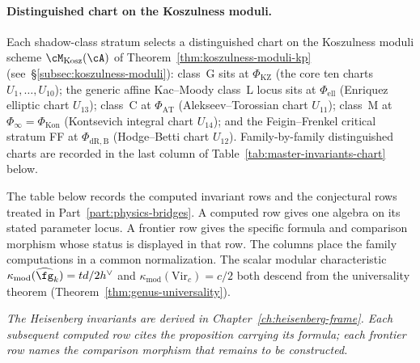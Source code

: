 \paragraph{Distinguished chart on the Koszulness moduli.}
Each shadow-class stratum selects a distinguished chart on the
Koszulness moduli scheme
$\cM_{\mathrm{Kosz}}(\cA)$ of
Theorem~\ref{thm:koszulness-moduli-kp}
(see~\S\ref{subsec:koszulness-moduli}):
class~G sits at $\Phi_{\mathrm{KZ}}$ (the core ten charts
$U_1,\ldots,U_{10}$); the generic affine Kac--Moody class~L locus sits
at $\Phi_{\mathrm{ell}}$ (Enriquez elliptic chart $U_{13}$); class~C at
$\Phi_{\mathrm{AT}}$ (Alekseev--Torossian chart $U_{11}$);
class~M at $\Phi_\infty = \Phi_{\mathrm{Kon}}$ (Kontsevich
integral chart $U_{14}$); and the Feigin--Frenkel critical
stratum FF at $\Phi_{\mathrm{dR,B}}$ (Hodge--Betti chart
$U_{12}$). Family-by-family distinguished charts are recorded in
the last column of Table~\ref{tab:master-invariants-chart}
below.

The table below records the computed invariant rows and the
conjectural rows treated in Part~\ref{part:physics-bridges}.  A
computed row gives one algebra on its stated parameter locus.  A
frontier row gives the specific formula and comparison morphism whose
status is displayed in that row.  The columns place the family
computations in a common normalization.
The scalar modular characteristic
$\kappa_{\mathrm{mod}}(\widehat{\fg}_k) = td/2h^\vee$
and $\kappa_{\mathrm{mod}}(\mathrm{Vir}_c) = c/2$ both descend from the universality
theorem (Theorem~\ref{thm:genus-universality}).

\noindent\emph{The Heisenberg invariants are derived in
Chapter~\ref{ch:heisenberg-frame}.  Each subsequent computed row
cites the proposition carrying its formula; each frontier row names
the comparison morphism that remains to be constructed.}

